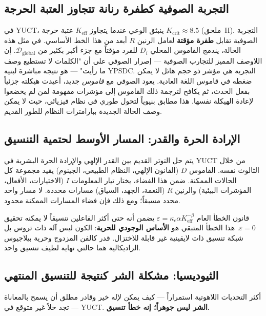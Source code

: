 \documentclass[12pt,a4paper]{article}
\begin{document}
	\subsection{التجربة الصوفية كطفرة رنانة تتجاوز العتبة الحرجة}
	
	في YUCT، ينبثق الوعي عندما يتجاوز \(K_{\mathrm{eff}}\) عتبة حرجة \(K_{\mathrm{crit}} \approx 8.5\) (ملحق~H). التجربة الصوفية تقابل \textbf{طفرة مؤقتة} لعامل الرنين \(R\) أبعد من هذا الخط الأساسي. في مثل هذه الحالة، يندمج القاموس المحلي \(D_i\) للفرد مؤقتاً مع جزء أكبر بكثير من \(\mathcal{D}_{\text{global}}\).
	إن اللاوصف المميز للتجارب الصوفية — إصرار الصوفي على أن "الكلمات لا تستطيع وصف ما رأيت" — هو نتيجة مباشرة لبنية YPSDC. التجربة هي مؤشر ذو حجم هائل لا يمكن ضغطه في قاموس اللغة العادية. يعود الصوفي مع \emph{قاموس} جديد، أعيدت هيكلته جزئياً بفعل الحدث، ثم يكافح لترجمة ذلك القاموس إلى مؤشرات مفهومة لمن لم يخضعوا لإعادة الهيكلة نفسها. هذا مطابق بنيوياً لتحول طوري في نظام فيزيائي، حيث لا يمكن وصف الحالة الجديدة ببارامترات النظام للطور القديم.
	
	\subsection{الإرادة الحرة والقدر: المسار الأوسط لحتمية التنسيق}
	
	يتم حل التوتر القديم بين القدر الإلهي والإرادة الحرة البشرية في YUCT من خلال الثالوث نفسه. القاموس \(D\) (القانون الإلهي، النظام الطبيعي، الجينوم) يقيد مجموعة كل الحالات الممكنة. ضمن هذا الفضاء، يختار تيار المعلومات \(I\) (الاختيارات، الأفعال، المؤشرات البيئية) والرنين \(R\) (النعمة، الجهد، السياق) مسارات محددة. لا مسار واحد محدد مسبقاً؛ ومع ذلك فإن فضاء المسارات الممكنة محدود.
	
	قانون الخطأ العام \(\varepsilon = \kappa_c \alpha K_{\mathrm{eff}}^{-\beta}\) يضمن أنه حتى أكثر الفاعلين تنسيقاً لا يمكنه تحقيق \(\varepsilon = 0\). هذا الخطأ المتبقي هو \textbf{الأساس الوجودي للحرية}: الكون ليس آلة ذات تروس بل شبكة تنسيق ذات لايقينية غير قابلة للاختزال. قدر كالفن المزدوج وحرية بيلاجيوس الراديكالية هما حالتي نهاية لطيف تنسيق واحد.
	
	\subsection{الثيوديسيا: مشكلة الشر كنتيجة للتنسيق المنتهي}
	
	أكثر التحديات اللاهوتية استمراراً — كيف يمكن لإله خير وقادر مطلق أن يسمح بالمعاناة — تجد حلاً غير متوقع في YUCT. \textbf{الشر ليس جوهراً؛ إنه خطأ تنسيق.}
	
\end{document}
